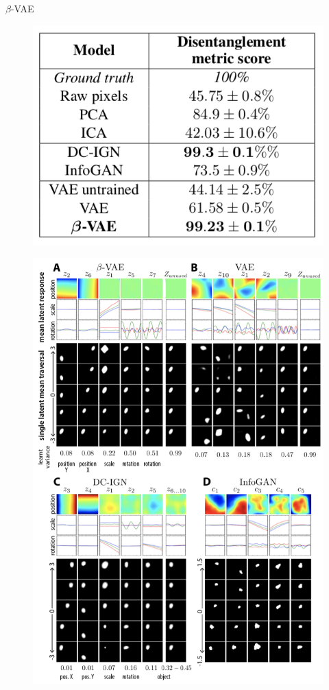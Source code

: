 \documentclass{beamer}
\begin{document}
\begin{frame}{$\beta$-VAE}
	\begin{minipage}[t]{0.5\columnwidth}
	    \vspace{1.5cm}
		\begin{figure}
			\centering
			\includegraphics[width=1.\linewidth]{figs/betaVAE_4.png}
		\end{figure}
	\end{minipage}%
	\begin{minipage}[t]{0.5\columnwidth}
		\begin{figure}[h]
			\centering
			\includegraphics[width=.95\linewidth]{figs/betaVAE_5.png}

\end{figure}
\end{minipage}
\end{frame}
\end{document}
